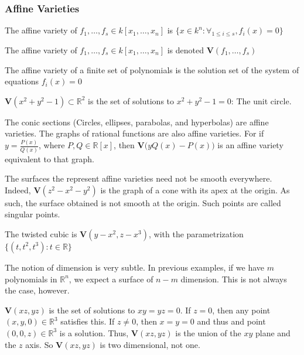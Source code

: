 \documentclass[crop=false,class=article,oneside]{standalone}
\begin{document}
    \subsubsection{Affine Varieties}
    \begin{definition}
    The affine variety of $f_1,\hdots, f_s \in k[x_1,\hdots ,x_n]$ is $\{x\in k^n:\forall_{1\leq i \leq s},f_i(x) = 0\}$
    \end{definition}
    \begin{notation}
    The affine variety of $f_{1},\hdots,f_{s}\in k[x_{1},\hdots,x_{n}]$ is denoted $\mathbf{V}(f_1,\hdots, f_s)$
    \end{notation}
    The affine variety of a finite set of polynomials is the solution set of the system of equations $f_{i}(x)=0$
    \begin{example}
    $\mathbf{V}(x^2+y^2-1)\subset\mathbb{R}^2$ is the set of solutions to $x^2+y^2-1 = 0$: The unit circle.
    \end{example}
    \begin{example}
    The conic sections (Circles, ellipses, parabolas, and hyperbolas) are affine varieties. The graphs of rational functions are also affine varieties. For if $y = \frac{P(x)}{Q(x)}$, where $P,Q\in \mathbb{R}[x]$, then $\mathbf{V}\big(yQ(x)-P(x)\big)$ is an affine variety equivalent to that graph.
    \end{example}
    \begin{example}
    The surfaces the represent affine varieties need not be smooth everywhere. Indeed, $\mathbf{V}(z^2-x^2-y^2)$ is the graph of a cone with its apex at the origin. As such, the surface obtained is not smooth at the origin. Such points are called singular points.
    \end{example}
    \begin{example}
    The twisted cubic is $\mathbf{V}(y-x^2,z-x^3)$, with the parametrization $\{(t,t^2,t^3):t\in \mathbb{R}\}$
    \end{example}
    The notion of dimension is very subtle. In previous examples, if we have $m$ polynomials in $\mathbb{R}^n$, we expect a surface of $n-m$ dimension. This is not always the case, however.
    \begin{example}
    $\mathbf{V}(xz,yz)$ is the set of solutions to $xy=yz=0$. If $z=0$, then any point $(x,y,0)\in \mathbb{R}^3$ satisfies this. If $z\ne 0$, then $x=y=0$ and thus and point $(0,0,z)\in \mathbb{R}^3$ is a solution. Thus, $\mathbf{V}(xz,yz)$ is the union of the $xy$ plane and the $z$ axis. So $\mathbf{V}(xz,yz)$ is two dimensional, not one.
    \end{example}
\end{document}
